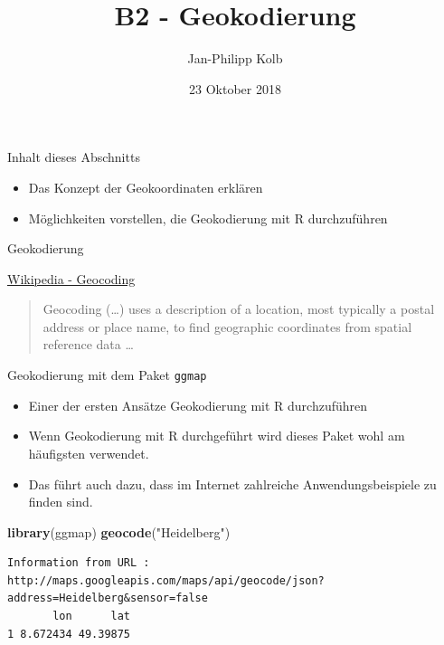 \documentclass[ignorenonframetext,]{beamer}
\title{B2 - Geokodierung}
\author{Jan-Philipp Kolb}
\date{23 Oktober 2018}
\newenvironment{Shaded}{\begin{snugshade}}{\end{snugshade}}
\newcommand{\KeywordTok}[1]{\textcolor[rgb]{0.13,0.29,0.53}{\textbf{#1}}}
\newcommand{\NormalTok}[1]{#1}
\newcommand{\StringTok}[1]{\textcolor[rgb]{0.31,0.60,0.02}{#1}}
\providecommand{\tightlist}{%
  \setlength{\itemsep}{0pt}\setlength{\parskip}{0pt}}
\begin{document}
\frame{\titlepage}

\begin{frame}{Inhalt dieses Abschnitts}
\protect\hypertarget{inhalt-dieses-abschnitts}{}

\begin{itemize}
\tightlist
\item
  Das Konzept der Geokoordinaten erklären
\item
  Möglichkeiten vorstellen, die Geokodierung mit R durchzuführen
\end{itemize}

\end{frame}

\begin{frame}{Geokodierung}
\protect\hypertarget{geokodierung}{}

\begin{block}{\href{https://github.com/adam-p/markdown-here/wiki/Markdown-Cheatsheet\#blockquotes}{Wikipedia
- Geocoding}}

\begin{quote}
Geocoding (\ldots{}) uses a description of a location, most typically a
postal address or place name, to find geographic coordinates from
spatial reference data \ldots{}
\end{quote}

\end{block}

\end{frame}

\begin{frame}[fragile]{Geokodierung mit dem Paket \texttt{ggmap}}
\protect\hypertarget{geokodierung-mit-dem-paket-ggmap}{}

\begin{itemize}
\tightlist
\item
  Einer der ersten Ansätze Geokodierung mit R durchzuführen
\item
  Wenn Geokodierung mit R durchgeführt wird dieses Paket wohl am
  häufigsten verwendet.
\item
  Das führt auch dazu, dass im Internet zahlreiche Anwendungsbeispiele
  zu finden sind.
\end{itemize}

\begin{Shaded}
\begin{Highlighting}[]
\KeywordTok{library}\NormalTok{(ggmap)}
\KeywordTok{geocode}\NormalTok{(}\StringTok{"Heidelberg"}\NormalTok{)}
\end{Highlighting}
\end{Shaded}

\begin{verbatim}
Information from URL : http://maps.googleapis.com/maps/api/geocode/json?address=Heidelberg&sensor=false
       lon      lat
1 8.672434 49.39875
\end{verbatim}

\end{frame}
\end{document}
